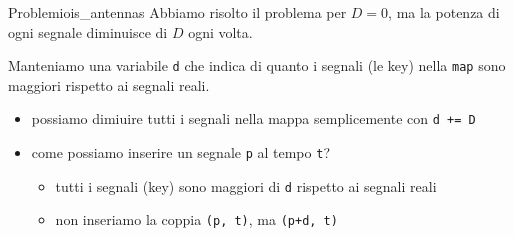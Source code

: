 \documentclass[compress]{beamer}
\begin{document}
\begin{frame}{Problemi}{ois\_antennas}
    Abbiamo risolto il problema per $D = 0$, ma la potenza di ogni segnale diminuisce di $D$ ogni volta.

    \pause
    Manteniamo una variabile \texttt{d} che indica di quanto i segnali (le key) nella \texttt{map} sono maggiori rispetto ai segnali reali.
    \pause
    \begin{itemize}
        \item possiamo dimiuire tutti i segnali nella mappa semplicemente con \texttt{d += D}
        \item come possiamo inserire un segnale \texttt{p} al tempo \texttt{t}?
        \pause
        \begin{itemize}
            \pause
            \item tutti i segnali (key) sono maggiori di \texttt{d} rispetto ai segnali reali
            \pause
            \item non inseriamo la coppia \texttt{(p, t)}, ma \texttt{(p+d, t)}
        \end{itemize}
    \end{itemize}
\end{frame}

\begin{frame}{}
\end{frame}
\end{document}
